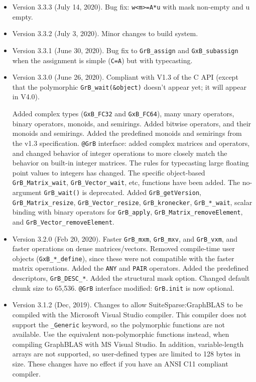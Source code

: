 \documentclass[12pt]{article}
\begin{document}
\begin{itemize}
\item Version 3.3.3 (July 14, 2020).
    Bug fix: \verb'w<m>=A*u' with mask non-empty and u empty.

\item Version 3.3.2 (July 3, 2020).  Minor changes to build system.

\item Version 3.3.1 (June 30, 2020).  Bug fix to \verb'GrB_assign' and
    \verb'GxB_subassign' when the assignment is simple (\verb'C=A') but
    with typecasting.

\item Version 3.3.0 (June 26, 2020).  Compliant with V1.3 of the C API
    (except that the polymorphic \verb'GrB_wait(&object)' doesn't appear yet;
    it will appear in V4.0).

    Added complex types (\verb'GxB_FC32' and \verb'GxB_FC64'), many unary
    operators, binary operators, monoids, and semirings.  Added bitwise
    operators, and their monoids and semirings.  Added the predefined monoids
    and semirings from the v1.3 specification.  \verb'@GrB' interface: added complex
    matrices and operators, and changed behavior of integer operations to more
    closely match the behavior on built-in integer matrices.  The rules for
    typecasting large floating point values to integers has changed.  The
    specific object-based \verb'GrB_Matrix_wait', \verb'GrB_Vector_wait', etc,
    functions have been added.  The no-argument \verb'GrB_wait()' is
    deprecated.  Added \verb'GrB_getVersion', \verb'GrB_Matrix_resize',
    \verb'GrB_Vector_resize', \verb'GrB_kronecker', \verb'GrB_*_wait', scalar
    binding with binary operators for \verb'GrB_apply', \newline
    \verb'GrB_Matrix_removeElement', and \verb'GrB_Vector_removeElement'.

\item Version 3.2.0 (Feb 20, 2020).  Faster \verb'GrB_mxm', \verb'GrB_mxv', and
    \verb'GrB_vxm', and faster operations on dense matrices/vectors.  Removed
    compile-time user objects (\verb'GxB_*_define'), since these were not
    compatible with the faster matrix operations.  Added the \verb'ANY' and
    \verb'PAIR' operators.  Added the predefined descriptors,
    \verb'GrB_DESC_*'.  Added the structural mask option.  Changed default
    chunk size to 65,536.  \verb'@GrB' interface modified:  \verb'GrB.init' is
    now optional.

\item Version 3.1.2 (Dec, 2019).  Changes to allow SuiteSparse:GraphBLAS
    to be compiled with the Microsoft Visual Studio compiler.  This compiler
    does not support the \verb'_Generic' keyword, so the polymorphic functions
    are not available.  Use the equivalent non-polymorphic functions instead,
    when compiling GraphBLAS with MS Visual Studio.  In addition,
    variable-length arrays are not supported, so user-defined types are limited
    to 128 bytes in size.  These changes have no effect if you have an ANSI C11
    compliant compiler.


\end{itemize}
\end{document}
